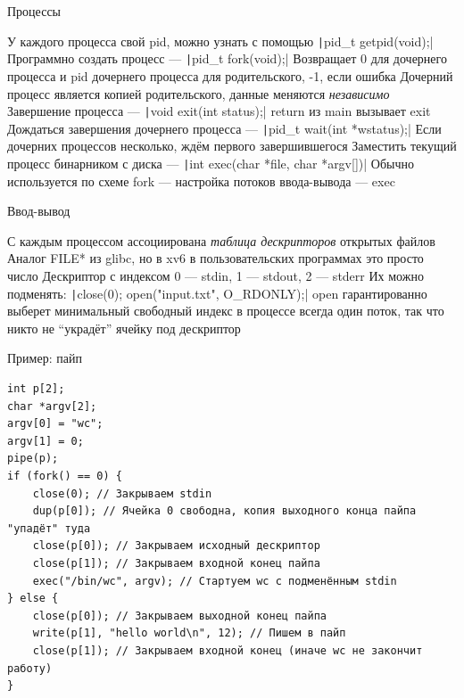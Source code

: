\documentclass{../../slides-style}
\begin{document}
    \begin{frame}[fragile]{Процессы}
        \begin{outline}
            \1 У каждого процесса свой pid, можно узнать с помощью \texttt|pid_t getpid(void);|
            \1 Программно создать процесс --- \texttt|pid_t fork(void);|
                \2 Возвращает 0 для дочернего процесса и pid дочернего процесса для родительского, -1, если ошибка
                \2 Дочерний процесс является копией родительского, данные меняются \emph{независимо}
            \1 Завершение процесса --- \texttt|void exit(int status);|
                \2 return из main вызывает exit
            \1 Дождаться завершения дочернего процесса --- \texttt|pid_t wait(int *wstatus);|
                \2 Если дочерних процессов несколько, ждём первого завершившегося
            \1 Заместить текущий процесс бинарником с диска --- \texttt|int exec(char *file, char *argv[])|
                \2 Обычно используется по схеме fork --- настройка потоков ввода-вывода --- exec
        \end{outline}
    \end{frame}

    \begin{frame}[fragile]{Ввод-вывод}
        \begin{outline}
            \1 С каждым процессом ассоциирована \emph{таблица дескрипторов} открытых файлов
                \2 Аналог FILE* из glibc, но в xv6 в пользовательских программах это просто число
            \1 Дескриптор с индексом 0 --- stdin, 1 --- stdout, 2 --- stderr
            \1 Их можно подменять: \texttt|close(0); open("input.txt", O_RDONLY);|
                \2 open гарантированно выберет минимальный свободный индекс
                \2 в процессе всегда один поток, так что никто не \enquote{украдёт} ячейку под дескриптор
        \end{outline}
    \end{frame}

    \begin{frame}[fragile]{Пример: пайп}
        \begin{footnotesize}
            \begin{verbatim}
int p[2];
char *argv[2];
argv[0] = "wc";
argv[1] = 0;
pipe(p);
if (fork() == 0) {
    close(0); // Закрываем stdin
    dup(p[0]); // Ячейка 0 свободна, копия выходного конца пайпа "упадёт" туда
    close(p[0]); // Закрываем исходный дескриптор
    close(p[1]); // Закрываем входной конец пайпа
    exec("/bin/wc", argv); // Стартуем wc с подменённым stdin
} else {
    close(p[0]); // Закрываем выходной конец пайпа
    write(p[1], "hello world\n", 12); // Пишем в пайп
    close(p[1]); // Закрываем входной конец (иначе wc не закончит работу)
}
            \end{verbatim}
        \end{footnotesize}
    \end{frame}
\end{document}
